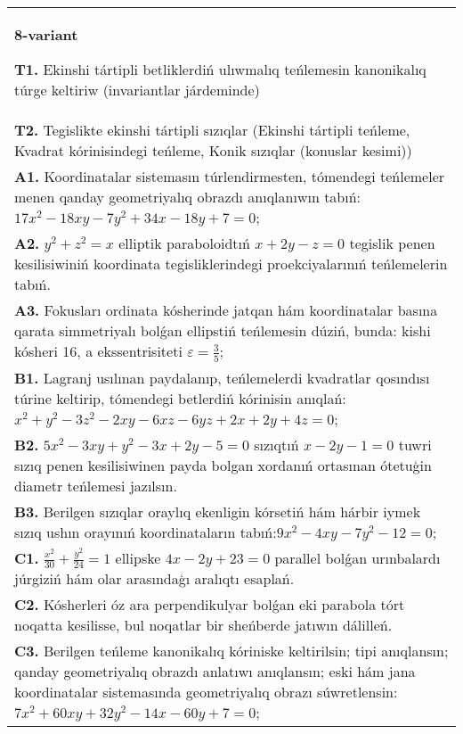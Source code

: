 \documentclass{article}
\begin{document}
\begin{tabular}{m{17cm}}
\textbf{8-variant}
\newline

\textbf{T1.} Ekinshi tártipli betliklerdiń ulıwmalıq teńlemesin kanonikalıq túrge keltiriw (invariantlar járdeminde) \\
\textbf{T2.} Tegislikte ekinshi tártipli sızıqlar (Ekinshi tártipli teńleme, Kvadrat kórinisindegi teńleme, Konik sızıqlar (konuslar kesimi)) \\
\textbf{A1.} Koordinatalar sistemasın túrlendirmesten, tómendegi teńlemeler menen qanday geometriyalıq obrazdı anıqlanıwın tabıń: $17 x^2-18 x y-7 y^2+34 x-18 y+7=0$; \\
\textbf{A2.} $y^2+z^2=x$ elliptik paraboloidtıń $x+2 y-z=0$ tegislik penen kesilisiwiniń koordinata tegisliklerindegi proekciyalarınıń teńlemelerin tabıń. \\
\textbf{A3.} Fokusları ordinata kósherinde jatqan hám koordinatalar basına qarata simmetriyalı bolǵan ellipstiń teńlemesin dúziń, bunda: kishi kósheri 16, a ekssentrisiteti $\varepsilon=\frac{3}{5}$; \\
\textbf{B1.} Lagranj usılınan paydalanıp, teńlemelerdi kvadratlar qosındısı túrine keltirip, tómendegi betlerdiń kórinisin anıqlań: $x^2+y^2-3 z^2-2 x y-6 x z-6 y z+2 x+2 y+4 z=0$; \\
\textbf{B2.} $5 x^2-3 x y+y^2-3 x+2 y-5=0$ sızıqtıń $x-2 y-1=0$ tuwri sızıq penen kesilisiwinen payda bolgan xordanıń ortasınan ótetuģin diametr teńlemesi jazılsın. \\
\textbf{B3.} Berilgen sızıqlar oraylıq ekenligin kórsetiń hám hárbir iymek sızıq ushın orayınıń koordinataların tabıń:$9 x^2-4 x y-7 y^2-12=0$; \\
\textbf{C1.} $\frac{x^2}{30}+\frac{y^2}{24}=1$ ellipske $4x-2y+23=0$ parallel bolǵan urınbalardı júrgiziń hám olar arasındaģı aralıqtı esaplań. \\
\textbf{C2.} Kósherleri óz ara perpendikulyar bolǵan eki parabola tórt noqatta kesilisse, bul noqatlar bir sheńberde jatıwın dálilleń. \\
\textbf{C3.} Berilgen teńleme kanonikalıq kóriniske keltirilsin; tipi anıqlansın; qanday geometriyalıq obrazdı anlatıwı anıqlansın; eski hám jana koordinatalar sistemasında geometriyalıq obrazı súwretlensin: $7 x^2+60 x y+32 y^2-14 x-60 y+7=0$; \\

\end{tabular}
\vspace{1cm}
\end{document}
